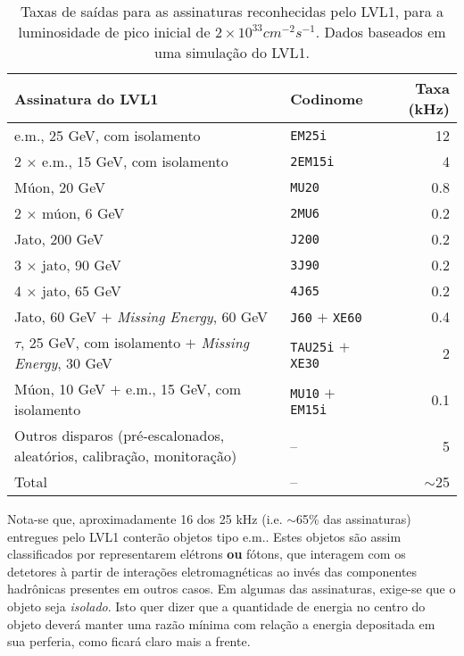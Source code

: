 \begin{table}
\caption{Taxas de saídas para as assinaturas reconhecidas pelo LVL1,
para a luminosidade de pico inicial de $2\times10^{33}cm^{-2}s^{-1}$. Dados
baseados em uma simulação do LVL1.}
\label{tab:l1-rates}
\begin{center}
\begin{sideways}
\begin{tabular}{|l|l|r|}
\hline
\textbf{Assinatura do LVL1} & \textbf{Codinome} & \textbf{Taxa (kHz)} \\ \hline
e.m., 25 GeV, com isolamento & \texttt{EM25i} & 12 \\ \hline
2 $\times$ e.m., 15 GeV, com isolamento & \texttt{2EM15i} & 4 \\ \hline
Múon, 20 GeV & \texttt{MU20} & 0.8 \\ \hline
2 $\times$ múon, 6 GeV & \texttt{2MU6} & 0.2 \\ \hline
Jato, 200 GeV & \texttt{J200} & 0.2 \\ \hline
3 $\times$ jato, 90 GeV & \texttt{3J90} & 0.2 \\ \hline
4 $\times$ jato, 65 GeV & \texttt{4J65} & 0.2 \\ \hline
Jato, 60 GeV $+$ \textit{Missing Energy}, 60 GeV & \texttt{J60} $+$
\texttt{XE60} & 0.4 \\ \hline
$\tau$, 25 GeV, com isolamento $+$ \textit{Missing Energy}, 30 GeV &
\texttt{TAU25i} $+$ \texttt{XE30} & 2 \\
\hline
Múon, 10 GeV $+$ e.m., 15 GeV, com isolamento & \texttt{MU10} $+$ \texttt{EM15i} & 0.1 \\ \hline
Outros disparos (pré-escalonados, aleatórios, calibração, monitoração) & -- & 5 \\
\hline
Total & -- & $\sim$25 \\ \hline
\end{tabular}
\end{sideways}
\end{center}
\end{table}

Nota-se que, aproximadamente 16 dos 25 kHz (i.e. $\sim$65\% das assinaturas)
entregues pelo LVL1 conterão objetos tipo e.m.. Estes objetos são assim
classificados por representarem elétrons \textbf{ou} fótons, que interagem com
os detetores à partir de interações eletromagnéticas ao invés das componentes
hadrônicas presentes em outros casos. Em algumas das assinaturas, exige-se que
o objeto seja \emph{isolado}. Isto quer dizer que a quantidade de energia no
centro do objeto deverá manter uma razão mínima com relação a energia
depositada em sua perferia, como ficará claro mais a frente.

